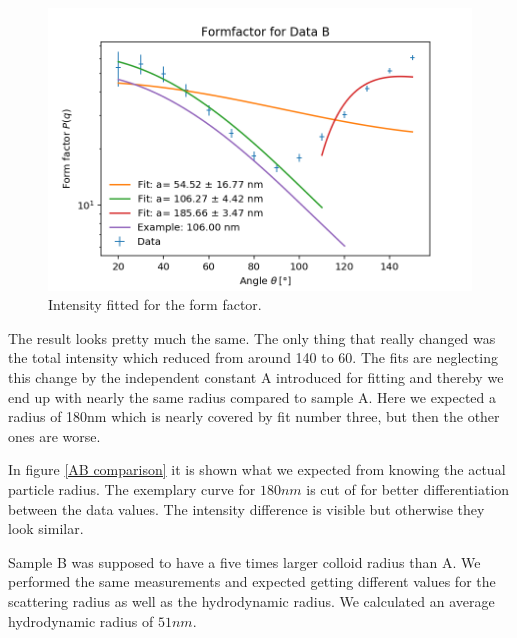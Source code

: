 \documentclass[]{article}
\begin{document}
\begin{figure}[!htbp]
\centering
\includegraphics[width=0.8\linewidth]{Plots/FormB.png}
\caption{Intensity fitted for the form factor.}
\label{FormB}
\end{figure}

The result looks pretty much the same. The only thing that really changed was the total intensity which reduced from around 140 to 60. The fits are neglecting this change by the independent constant A introduced for fitting and thereby we end up with nearly the same radius compared to sample A. 
Here we expected a radius of 180nm which is nearly covered by fit number three, but then the other ones are worse.

In figure  \ref{AB comparison} it is shown what we expected from knowing the actual particle radius. The exemplary curve for $180nm$ is cut of for better differentiation between the data values. The intensity difference is visible but otherwise they look similar. 


Sample B was supposed to have a five times larger colloid radius than A. We performed the same measurements and expected getting different values for the scattering radius as well as the hydrodynamic radius. 
We calculated an average hydrodynamic radius of $51 nm$. 
\end{document}
